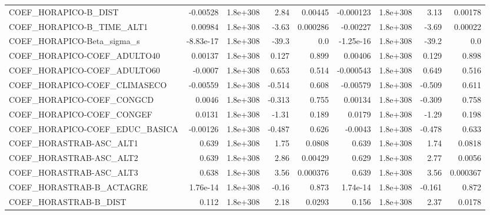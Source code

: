 \begin{tabular}{lrrrrrrrr}
COEF\_HORAPICO-B\_DIST              &    -0.00528 &     1.8e+308 &      2.84 &  0.00445 &  -0.000123 &    1.8e+308 &         3.13 &       0.00178 \\
COEF\_HORAPICO-B\_TIME\_ALT1         &     0.00984 &     1.8e+308 &     -3.63 & 0.000286 &   -0.00227 &    1.8e+308 &        -3.69 &       0.00022 \\
COEF\_HORAPICO-Beta\_sigma\_s        &   -8.83e-17 &     1.8e+308 &     -39.3 &      0.0 &  -1.25e-16 &    1.8e+308 &        -39.2 &           0.0 \\
COEF\_HORAPICO-COEF\_ADULTO40       &     0.00137 &     1.8e+308 &     0.127 &    0.899 &    0.00406 &    1.8e+308 &        0.129 &         0.898 \\
COEF\_HORAPICO-COEF\_ADULTO60       &     -0.0007 &     1.8e+308 &     0.653 &    0.514 &  -0.000543 &    1.8e+308 &        0.649 &         0.516 \\
COEF\_HORAPICO-COEF\_CLIMASECO      &    -0.00559 &     1.8e+308 &    -0.514 &    0.608 &   -0.00579 &    1.8e+308 &       -0.509 &         0.611 \\
COEF\_HORAPICO-COEF\_CONGCD         &      0.0046 &     1.8e+308 &    -0.313 &    0.755 &    0.00134 &    1.8e+308 &       -0.309 &         0.758 \\
COEF\_HORAPICO-COEF\_CONGEF         &      0.0131 &     1.8e+308 &     -1.31 &    0.189 &     0.0179 &    1.8e+308 &        -1.29 &         0.198 \\
COEF\_HORAPICO-COEF\_EDUC\_BASICA    &    -0.00126 &     1.8e+308 &    -0.487 &    0.626 &    -0.0043 &    1.8e+308 &       -0.478 &         0.633 \\
COEF\_HORASTRAB-ASC\_ALT1           &       0.639 &     1.8e+308 &      1.75 &   0.0808 &      0.639 &    1.8e+308 &         1.74 &        0.0818 \\
COEF\_HORASTRAB-ASC\_ALT2           &       0.639 &     1.8e+308 &      2.86 &  0.00429 &      0.629 &    1.8e+308 &         2.77 &        0.0056 \\
COEF\_HORASTRAB-ASC\_ALT3           &       0.638 &     1.8e+308 &      3.56 & 0.000376 &      0.639 &    1.8e+308 &         3.56 &      0.000367 \\
COEF\_HORASTRAB-B\_ACTAGRE          &    1.76e-14 &     1.8e+308 &     -0.16 &    0.873 &   1.74e-14 &    1.8e+308 &       -0.161 &         0.872 \\
COEF\_HORASTRAB-B\_DIST             &       0.112 &     1.8e+308 &      2.18 &   0.0293 &      0.156 &    1.8e+308 &         2.37 &        0.0178 \\

\end{tabular}
